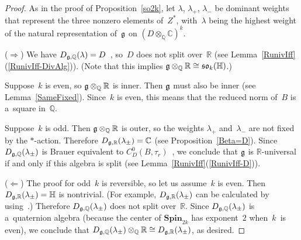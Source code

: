 \begin{proof}
As in the proof of Proposition~\ref{so2k}, let $\lambda$, $\lambda_+$, $\lambda_-$ be dominant weights that represent the three nonzero
elements of~$Z^*$, with~$\lambda$ being the highest weight of the natural representation of~$\Lie G$ on
$(D\otimes_\mathbb{Q} \mathbb{C})^k$.

($\Rightarrow$) We have $D_{\Lie G, \mathbb{Q}}(\lambda) = D$~\cite[p.~379]{KnusEtAl-BookOfInvols}, so~$D$ does not
split over~$\mathbb{R}$ (see Lemma~\ref{RunivIff}(\ref{RunivIff-DivAlg})).
(Note that this implies $\Lie G \otimes_\mathbb{Q} \mathbb{R} \cong \Lie{SO}_k(\mathbb{H})$.)

Suppose~$k$ is even, so $\Lie G \otimes_\mathbb{Q} \mathbb{R}$ is inner.
Then $\Lie G$ must also be inner (see Lemma~\ref{SameFixed}).
Since~$k$ is even, this means that the reduced norm of~$B$ is a~square in~$\mathbb{Q}$.

Suppose~$k$ is odd.
Then $\Lie G \otimes_\mathbb{Q} \mathbb{R}$ is outer, so the weights $\lambda_+$ and~$\lambda_-$ are not f\/ixed by the
$*$-action.
Therefore $D_{\Lie G, \mathbb{R}}(\lambda_{\pm}) = \mathbb{C}$ (see Proposition~\ref{Beta=D}).
Since $D_{\Lie G, \mathbb{Q}}(\lambda_{\pm})$ is Brauer equivalent to $C^0_D(B,
\tau_r)$~\cite[p.~379]{KnusEtAl-BookOfInvols}, we conclude that $\Lie G$ is $\mathbb{R}$-universal if and only if this
algebra is split (see Lemma~\ref{RunivIff}(\ref{RunivIff-D})).

($\Leftarrow$) The proof for odd~$k$ is reversible, so let us assume~$k$ is even.
Then $D_{\Lie G, \mathbb{R}}(\lambda_{\pm}) = \mathbb{H}$ is nontrivial.
(For example, $D_{\Lie G, \mathbb{R}}(\lambda_{\pm})$ can be calculated by using~\cite[\S~5.5]{Tits-RepLinIrred}.)
Therefore $D_{\Lie G, \mathbb{Q}}(\lambda_{\pm})$ does not split over~$\mathbb{R}$.
Since $D_{\Lie G, \mathbb{Q}}(\lambda_{\pm})$ is a~quaternion algebra (because the center of $\mathbf{Spin}_{2k}$ has
exponent~$2$ when~$k$~is even), we conclude that $D_{\Lie G, \mathbb{Q}}(\lambda_{\pm}) \otimes_\mathbb{Q} \mathbb{R}
\cong D_{\Lie G, \mathbb{R}}(\lambda_{\pm})$, as desired.
\end{proof}

